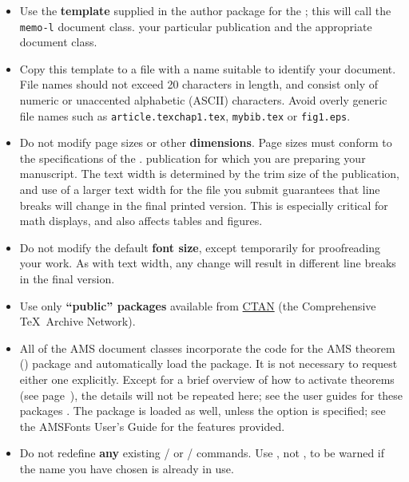 \begin{itemize}

\item Use the \textbf{template} supplied in the author package for
 \ifmemoirs
  the \Memos; this will call the \verb+memo-l+ document class.
 \else
  your particular publication and the appropriate document class.
 \fi

\item Copy this template to a file with a name suitable to identify
 your document.  File names should not exceed 20 characters in length,
 and consist only of numeric or unaccented alphabetic (ASCII) characters.
 Avoid overly generic file names such as
 {\texttt{article.tex}}{\texttt{chap1.tex}},
 \texttt{mybib.tex} or \texttt{fig1.eps}.

\item Do not modify page sizes or other \textbf{dimensions}.
 Page sizes must conform to the specifications of the
 \ifmemoirs \Memos.
 \else
  publication for which you are preparing your manuscript.
 \fi
 The text width is determined by the trim size of the publication, and
 use of a larger text width for the file you submit guarantees that
 line breaks will change in the final printed version.  This is
 especially critical for math displays, and also affects tables and
 figures.

\item Do not modify the default \textbf{font size}, except temporarily
 for proofreading your work.  As with text width, any change will result
 in different line breaks in the final version.

\item Use only \textbf{``public'' packages} available from
 \href{http://www.ctan.org/search.html}{CTAN} (the Comprehensive
 \TeX\ Archive Network).

\item All of the AMS document classes incorporate the code for the AMS
 theorem () package and automatically load the 
 package.  It is not necessary to request either one explicitly.
 Except for a brief overview of how to activate theorems (see
 page~\pageref{ss:thmsetup}), the details will not be repeated here;
 see the user guides for these packages \cite{ATH,AMG}.
 The  package is loaded
 as well, unless the  option is specified; see the
 AMSFonts User's Guide \cite{AFG} for the features provided.

\item Do not redefine \textbf{any} existing \latex/ or \amslatex/
 commands.  Use , not , to be warned if the
 name you have chosen is already in use.


\end{itemize}
